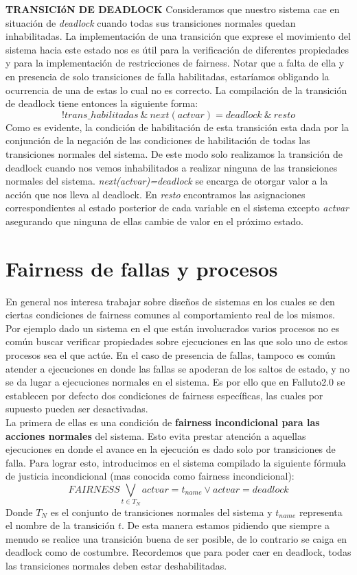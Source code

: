 \documentclass[titlepage, 12pt]{book}
\begin{document}
\textbf{TRANSICI\'oN DE DEADLOCK}
Consideramos que nuestro sistema cae en situaci\'on de \textit{deadlock} cuando todas sus transiciones normales quedan inhabilitadas. La implementaci\'on de una transici\'on que exprese el movimiento del sistema hacia este estado nos es \'util para la verificaci\'on de diferentes propiedades y para la implementaci\'on de restricciones de fairness. Notar que a falta de ella y en presencia de solo transiciones de falla habilitadas, estar\'iamos obligando la ocurrencia de una de estas lo cual no es correcto. La compilaci\'on de la transici\'on de deadlock tiene entonces la siguiente forma:
$$!trans\_habilitadas~\&~next(actvar)=deadlock~\&~resto$$
Como es evidente, la condici\'on de habilitaci\'on de esta transici\'on esta dada por la conjunci\'on de la negaci\'on de las condiciones de habilitaci\'on de todas las transiciones normales del sistema. De este modo solo realizamos la transici\'on de deadlock cuando nos vemos inhabilitados a realizar ninguna de las transiciones normales del sistema. \textit{next(actvar)=deadlock} se encarga de otorgar valor a la acci\'on que nos lleva al deadlock. En \textit{resto} encontramos las asignaciones correspondientes al estado posterior de cada variable en el sistema excepto \textit{actvar} asegurando que ninguna de ellas cambie de valor en el pr\'oximo estado.



\section{Fairness de fallas y procesos}
En general nos interesa trabajar sobre diseños de sistemas en los cuales se den ciertas condiciones de fairness comunes al comportamiento real de los mismos. Por ejemplo dado un sistema en el que est\'an involucrados varios procesos no es com\'un buscar verificar propiedades sobre ejecuciones en las que solo uno de estos procesos sea el que act\'ue. En el caso de presencia de fallas, tampoco es com\'un atender a ejecuciones en donde las fallas se apoderan de los saltos de estado, y no se da lugar a ejecuciones normales en el sistema. Es por ello que en Falluto2.0 se establecen por defecto dos condiciones de fairness espec\'ificas, las cuales por supuesto pueden ser desactivadas.\\

La primera de ellas es una condici\'on de \textbf{fairness incondicional para las acciones normales} del sistema. Esto evita prestar atenci\'on a aquellas ejecuciones en donde el avance en la ejecuci\'on es dado solo por transiciones de falla. Para lograr esto, introducimos en el sistema compilado la siguiente f\'ormula de justicia incondicional (mas conocida como fairness incondicional):
$$FAIRNESS \bigvee_{t \in T_N} actvar = t_{name} \vee actvar = deadlock$$
Donde $T_N$ es el conjunto de transiciones normales del sistema y $t_{name}$ representa el nombre de la transici\'on $t$. De esta manera estamos pidiendo que siempre a menudo se realice una transici\'on buena de ser posible, de lo contrario se caiga en deadlock como de costumbre. Recordemos que para poder caer en deadlock, todas las transiciones normales deben estar deshabilitadas.\\
\end{document}
